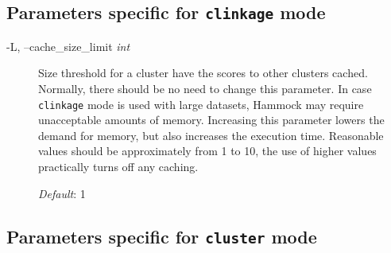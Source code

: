 \documentclass[11pt, a4paper, twoside, titlepage]{article}
\begin{document}
\subsection{Parameters specific for \texttt{clinkage} mode}
\label{parametersClinkage}
\begin{description}


\item[-L, --cache\_size\_limit \rm \textlangle \textit{int}\textrangle] Size threshold for a cluster have the scores to other clusters cached. Normally, there should be no need to change this parameter. In case \texttt{clinkage} mode is used with large datasets, Hammock may require unacceptable amounts of memory. Increasing this parameter lowers the demand for memory, but also increases the execution time. Reasonable values should be approximately from 1 to 10, the use of higher values practically turns off any caching. 

\textit{Default}: 1

\end{description}


\subsection{Parameters specific for \texttt{cluster} mode}
\label{parametersCluster}
\end{document}
